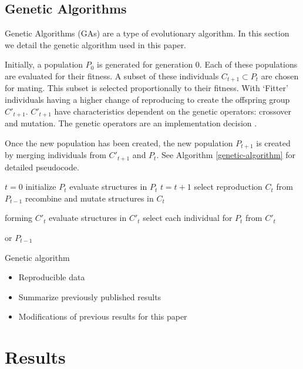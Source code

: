 \documentclass[final,3p,times,twocolumn,numbers]{elsarticle}
\begin{document}
\subsection{Genetic Algorithms}

Genetic Algorithms (GAs) are a type of evolutionary algorithm. In this section we detail the genetic algorithm used in this paper.

Initially, a population $P_{0}$ is generated for generation 0. Each of these populations are evaluated for their fitness. A subset of these individuals $C_{t+1} \subset P_{t}$ are chosen for mating. This subset is selected proportionally to their fitness. With `Fitter' individuals having a higher change of reproducing to create the offspring group $C'_{t+1}$. $C'_{t+1}$ have characteristics dependent on the genetic operators: crossover and mutation. The genetic operators are an implementation decision \cite{FogelDavidB2009}. 

Once the new population has been created, the new population $P_{t+1}$ is created by merging individuals from $C'_{t+1}$ and $P_{t}$. See Algorithm \ref{genetic-algorithm} for detailed pseudocode.
%
\begin{algorithm}[t]
\begin{algorithmic}[1]
\State $t=0$
\State initialize $P_{t}$
\State evaluate structures in $P_{t}$
\State $t=t+1$
\State select reproduction $C_{t}$ from $P_{t-1}$
\State recombine and mutate structures in $C_{t}$

forming $C'_{t}$
\State evaluate structures in $C'_{t}$
\State select each individual for $P_{t}$ from $C'_{t}$ 

or $P_{t-1}$
\EndWhile
\caption{Genetic algorithm \cite{FogelDavidB2009}}
\label{genetic-algorithm}
\end{algorithmic}
\end{algorithm}



\begin{itemize}
	\item Reproducible data
	\item Summarize previously published results
	\item Modifications of previous results for this paper
\end{itemize}

\section{Results}
\label{sec:results}
\end{document}
